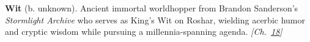 \textbf{Wit} (b. unknown). Ancient immortal worldhopper from Brandon Sanderson's \emph{Stormlight Archive} who serves as King's Wit on Roshar, wielding acerbic humor and cryptic wisdom while pursuing a millennia-spanning agenda. \emph{[Ch.~\hyperref[ch:speculativeexecutionattacks]{18}]}

